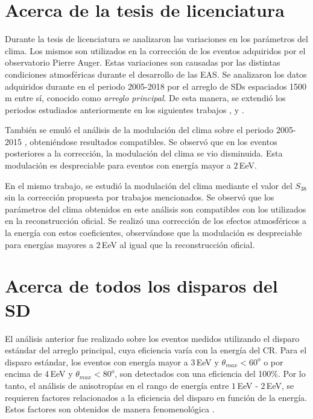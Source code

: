 
\section{Acerca de la tesis de licenciatura}

Durante la tesis de licenciatura se analizaron las variaciones en los parámetros del clima. Los mismos son utilizados en la corrección de los eventos adquiridos por el observatorio Pierre Auger. Estas variaciones son causadas por las distintas condiciones atmosféricas durante el desarrollo de las EAS. Se analizaron los datos adquiridos durante en el periodo 2005-2018 por el arreglo de SDs espaciados 1500 m entre sí, conocido como \emph{arreglo principal}. De esta manera, se extendió los periodos estudiados anteriormente en los siguientes trabajos \cite{abraham2009atmospheric}, \cite{abreu2012description}   y \cite{aab2017impact}. 

También se emuló el análisis de la modulación del clima sobre el periodo 2005-2015 \cite{aab2017impact}, obteniéndose resultados compatibles. Se observó que en los eventos posteriores a la corrección, la modulación del clima se vio disminuida. Esta modulación es despreciable para eventos con energía mayor a $2\,$EeV.

En el mismo trabajo, se estudió la modulación del clima mediante el valor del $S_{38}$ sin la corrección propuesta por trabajos mencionados. Se observó que los parámetros del clima obtenidos en este análisis son compatibles con los utilizados en la reconstrucción oficial. Se realizó una corrección de los efectos atmosféricos a la energía con estos coeficientes, observándose que la modulación es despreciable para energías mayores a $2\,$EeV al igual que la reconstrucción oficial. 

\section{Acerca de todos los disparos del SD}

El análisis anterior fue realizado sobre los eventos medidos utilizando el disparo estándar del arreglo principal, cuya eficiencia varía con la energía del CR. Para el disparo estándar, los eventos con energía mayor a $3\,$EeV y $\theta_{max}<60^o$ o  por encima de $4\,$EeV y $\theta_{max}<80^o$, son detectados con una eficiencia del 100\%. Por lo tanto, el análisis de anisotropías en el rango de energía entre $1\,$EeV - $2\,$EeV, se requieren factores relacionados a la eficiencia del disparo en función de la energía. Estos factores son obtenidos de manera fenomenológica \cite{taborda}. 

